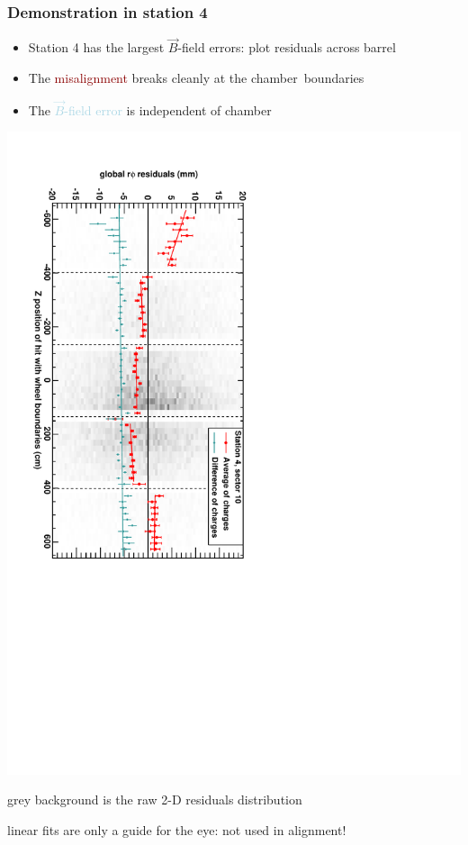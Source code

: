 \documentclass[compress]{beamer}
\begin{document}
\begin{frame}
\frametitle{Demonstration in station 4}

\begin{itemize}
\item Station 4 has the largest $\vec{B}$-field errors: plot residuals across barrel
\item The \textcolor{darkred}{misalignment} breaks cleanly at the \mbox{chamber boundaries\hspace{-1 cm}}
\item The \textcolor{lightblue}{$\vec{B}$-field error} is independent of chamber
\end{itemize}

\includegraphics[height=\linewidth, angle=90]{demo_of_bfield.pdf}

\scriptsize grey background is the raw 2-D residuals distribution

linear fits are only a guide for the eye: not used in alignment!
\end{frame}
\end{document}
